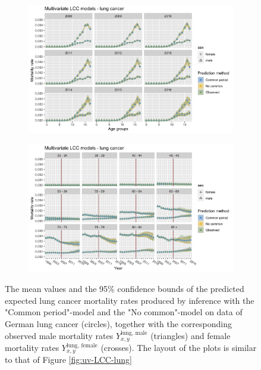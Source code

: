 \begin{figure}[h!]
    \centering
    \begin{subfigure}[b]{.75\linewidth}
        \includegraphics[width=\linewidth]{real-data/real-data-multivariate/Figures/multivariate-LCC-by-age-lung.png}
    \end{subfigure}
    
    \begin{subfigure}[b]{.75\linewidth}
        \includegraphics[width=\linewidth]{real-data/real-data-multivariate/Figures/multivariate-LCC-by-period-lung.png}
    \end{subfigure}
    
    \caption{The mean values and the 95\% confidence bounds of the predicted expected lung cancer mortality rates produced by inference with the "Common period"-model and the "No common"-model on data of German lung cancer (circles), together with the corresponding observed male mortality rates $Y_{x,y}^{\text{lung, male}}$ (triangles) and female mortality rates $Y_{x,y}^{\text{lung, female}}$ (crosses). The layout of the plots is similar to that of Figure \ref{fig:uv-LCC-lung}}
    \label{fig:mv-LCC-lung}
\end{figure}

